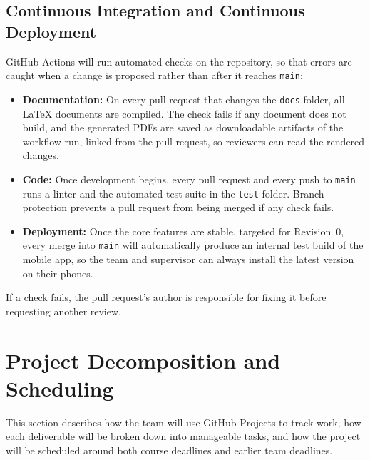 \documentclass{article}
\begin{document}
\subsection{Continuous Integration and Continuous Deployment} \label{SecCICD}

GitHub Actions will run automated checks on the repository, so that errors are caught when a change is proposed rather than after it reaches \texttt{main}:

\begin{itemize}
  \item \textbf{Documentation:} On every pull request that changes the \texttt{docs} folder, all \LaTeX{} documents are compiled. 
  The check fails if any document does not build, and the generated PDFs are saved as downloadable artifacts of the workflow run, linked from the pull request, so reviewers can read the rendered changes.
  \item \textbf{Code:} Once development begins, every pull request and every push to \texttt{main} runs a linter and the automated test suite in the \texttt{test} folder. 
  Branch protection prevents a pull request from being merged if any check fails.
  \item \textbf{Deployment:} Once the core features are stable, targeted for Revision~0, every merge into \texttt{main} will automatically produce an internal test build of the mobile app, so the team and supervisor can always install the latest version on their phones.
\end{itemize}

If a check fails, the pull request's author is responsible for fixing it before requesting another review.


\section{Project Decomposition and Scheduling} \label{SecDecomposition}



This section describes how the team will use GitHub Projects to track work, how each deliverable will be broken down into manageable tasks, 
and how the project will be scheduled around both course deadlines and earlier team deadlines.
\end{document}
